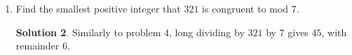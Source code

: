 \documentclass{article}
\theoremstyle{definition}
\newtheorem*{solution}{Solution}
\begin{document}
\begin{multicols}{2}
\begin{enumerate}
            \begin{solution}
                We could try to subtract out all the $4$'s: $123$, $119$, $115$...
                However, the easiest way is to get rid of all the $4$'s at once, dividing by $4$ and keeping only the remainder.
                Long dividing $123$ by $4$ gives $30$, with remainder $3$.
            \end{solution}
        \item Find the smallest positive integer that $321$ is congruent to mod $7$.
            \begin{solution}
                Similarly to problem 4, long dividing by $321$ by $7$ gives $45$, with remainder $6$.
            \end{solution}
    \end{enumerate}
\end{multicols}
\end{document}
